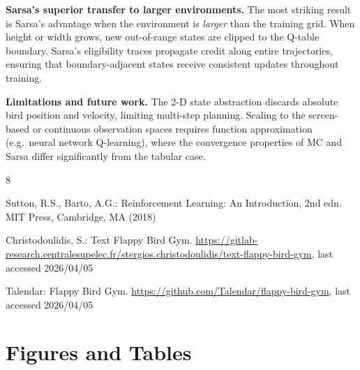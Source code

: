 \documentclass[runningheads]{llncs}
\begin{document}
\textbf{Sarsa's superior transfer to larger environments.}
The most striking result is Sarsa's advantage when the environment is
\emph{larger} than the training grid.
When height or width grows, new out-of-range states are clipped to the
Q-table boundary.
Sarsa's eligibility traces propagate credit along entire trajectories,
ensuring that boundary-adjacent states receive consistent updates throughout
training.

\textbf{Limitations and future work.}
The 2-D state abstraction discards absolute bird position and velocity,
limiting multi-step planning.
Scaling to the screen-based or continuous observation spaces requires
function approximation (e.g.\ neural network Q-learning), where the
convergence properties of MC and Sarsa differ significantly from the
tabular case.

\begin{thebibliography}{8}

Sutton, R.S., Barto, A.G.:
Reinforcement Learning: An Introduction, 2nd edn.
MIT Press, Cambridge, MA (2018)

Christodoulidis, S.: Text Flappy Bird Gym.
\url{https://gitlab-research.centralesupelec.fr/stergios.christodoulidis/text-flappy-bird-gym},
last accessed 2026/04/05

Talendar: Flappy Bird Gym.
\url{https://github.com/Talendar/flappy-bird-gym},
last accessed 2026/04/05

\end{thebibliography}

\clearpage
\appendix
\section{Figures and Tables}
\end{document}
